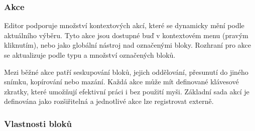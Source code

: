







\subsubsection{Akce}

Editor podporuje množství kontextových akcí, které se dynamicky mění podle aktuálního výběru. 
Tyto akce jsou dostupné buď v kontextovém menu (pravým kliknutím), nebo jako globální nástroj nad označenými bloky. 
Rozhraní pro akce se aktualizuje podle typu a množství označených bloků.

Mezi běžné akce patří seskupování bloků, jejich oddělování, přesunutí do jiného snímku, kopírování nebo mazání. 
Každá akce může mít definované klávesové zkratky, které umožňují efektivní práci i bez použití myši. 
Základní sada akcí je definována jako rozšiřitelná a jednotlivé akce lze registrovat externě.

\subsubsection{Vlastnosti bloků}

